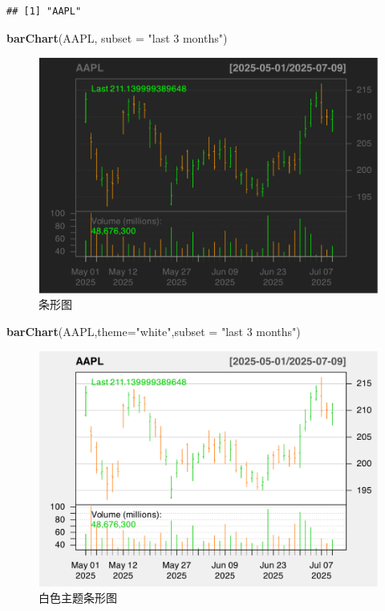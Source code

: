 \documentclass[]{ctexbook}
\newenvironment{Shaded}{\begin{snugshade}}{\end{snugshade}}
\newcommand{\AttributeTok}[1]{\textcolor[rgb]{0.13,0.29,0.53}{#1}}
\newcommand{\FunctionTok}[1]{\textcolor[rgb]{0.13,0.29,0.53}{\textbf{#1}}}
\newcommand{\NormalTok}[1]{#1}
\newcommand{\StringTok}[1]{\textcolor[rgb]{0.31,0.60,0.02}{#1}}
\begin{document}
\begin{verbatim}
## [1] "AAPL"
\end{verbatim}

\begin{Shaded}
\begin{Highlighting}[]
\FunctionTok{barChart}\NormalTok{(AAPL, }\AttributeTok{subset =} \StringTok{"last 3 months"}\NormalTok{)}
\end{Highlighting}
\end{Shaded}

\begin{figure}
\includegraphics[width=0.9\linewidth]{quantmod_files/figure-latex/bar-1} \caption{条形图}\label{fig:bar}
\end{figure}

\begin{Shaded}
\begin{Highlighting}[]
\FunctionTok{barChart}\NormalTok{(AAPL,}\AttributeTok{theme=}\StringTok{"white"}\NormalTok{,}\AttributeTok{subset =} \StringTok{"last 3 months"}\NormalTok{)}
\end{Highlighting}
\end{Shaded}

\begin{figure}
\includegraphics[width=0.9\linewidth]{quantmod_files/figure-latex/barWhite-1} \caption{白色主题条形图}\label{fig:barWhite}
\end{figure}
\end{document}
